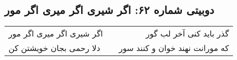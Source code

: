 \begin{center}
\section*{دوبیتی شماره ۶۲: اگر شیری اگر میری اگر مور}
\label{sec:062}
\begin{longtable}{l p{0.5cm} r}
اگر شیری اگر میری اگر مور
&&
گذر باید کنی آخر لب گور
\\
دلا رحمی بجان خویشتن کن
&&
که مورانت نهند خوان و کنند سور
\\
\end{longtable}
\end{center}
